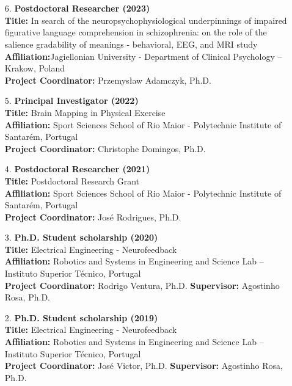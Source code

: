 \section*{}

\begin{enumerate}

  \item[6.] \textbf{Postdoctoral Researcher (2023)} \\
  \textbf{Title:} In search of the neuropsychophysiological underpinnings of impaired figurative language comprehension in schizophrenia: on the role of the salience gradability of meanings - behavioral, EEG, and MRI study \\
  \textbf{Affiliation:}Jagiellonian University - Department of Clinical Psychology – Krakow, Poland \\
  \textbf{Project Coordinator:} Przemysław Adamczyk, Ph.D.
  
  \item[5.] \textbf{Principal Investigator (2022)} \\
  \textbf{Title:} Brain Mapping in Physical Exercise  \\
  \textbf{Affiliation:} Sport Sciences School of Rio Maior - Polytechnic Institute of Santarém, Portugal \\
  \textbf{Project Coordinator:} Christophe Domingos, Ph.D.

  \item[4.] \textbf{Postdoctoral Researcher (2021)} \\
  \textbf{Title:} Postdoctoral Research Grant \\
  \textbf{Affiliation:} Sport Sciences School of Rio Maior - Polytechnic Institute of Santarém, Portugal \\
  \textbf{Project Coordinator:} José Rodrigues, Ph.D.

  \item[3.] \textbf{Ph.D. Student scholarship (2020)} \\
  \textbf{Title:} Electrical Engineering - Neurofeedback \\
  \textbf{Affiliation:} Robotics and Systems in Engineering and Science Lab – Instituto Superior Técnico, Portugal \\
  \textbf{Project Coordinator:} Rodrigo Ventura, Ph.D. \textbf{Supervisor:} Agostinho Rosa, Ph.D.

  \item[2.] \textbf{Ph.D. Student scholarship (2019)} \\
  \textbf{Title:} Electrical Engineering - Neurofeedback \\
  \textbf{Affiliation:} Robotics and Systems in Engineering and Science Lab – Instituto Superior Técnico, Portugal \\
  \textbf{Project Coordinator:} José Victor, Ph.D. \textbf{Supervisor:} Agostinho Rosa, Ph.D.


\end{enumerate}
